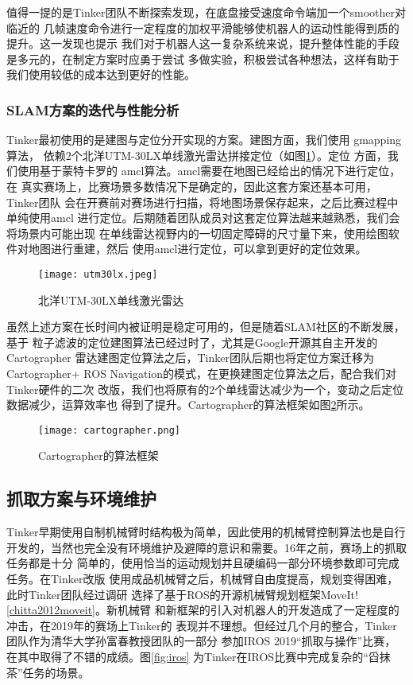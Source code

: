 值得一提的是Tinker团队不断探索发现，在底盘接受速度命令端加一个smoother对临近的
几帧速度命令进行一定程度的加权平滑能够使机器人的运动性能得到质的提升。这一发现也提示
我们对于机器人这一复杂系统来说，提升整体性能的手段是多元的，在制定方案时应勇于尝试
多做实验，积极尝试各种想法，这样有助于我们使用较低的成本达到更好的性能。

\subsubsection{SLAM方案的迭代与性能分析}

Tinker最初使用的是建图与定位分开实现的方案。建图方面，我们使用 gmapping算法\cite{grisettiyz2005improving}，
依赖2个北洋UTM-30LX单线激光雷达拼接定位（如图\ref{fig:utm30lx}）。定位
方面，我们使用基于蒙特卡罗的
amcl算法\cite{fox2002kld}。amcl需要在地图已经给出的情况下进行定位，在
真实赛场上，比赛场景多数情况下是确定的，因此这套方案还基本可用，Tinker团队
会在开赛前对赛场进行扫描，将地图场景保存起来，之后比赛过程中单纯使用amcl
进行定位。后期随着团队成员对这套定位算法越来越熟悉，我们会将场景内可能出现
在单线雷达视野内的一切固定障碍的尺寸量下来，使用绘图软件对地图进行重建，然后
使用amcl进行定位，可以拿到更好的定位效果。

\begin{figure}
  \centering
  \texttt{[image: utm30lx.jpeg]}
  \caption{北洋UTM-30LX单线激光雷达}
  \label{fig:utm30lx}
\end{figure}


虽然上述方案在长时间内被证明是稳定可用的，但是随着SLAM社区的不断发展，基于
粒子滤波的定位建图算法已经过时了，尤其是Google开源其自主开发的Cartographer
雷达建图定位算法\cite{hess2016real}之后，Tinker团队后期也将定位方案迁移为Cartographer+
ROS Navigation的模式，在更换建图定位算法之后，配合我们对Tinker硬件的二次
改版，我们也将原有的2个单线雷达减少为一个，变动之后定位数据减少，运算效率也
得到了提升。Cartographer的算法框架如图\ref{fig:cartographer}所示。

\begin{figure}[h] %
  \centering
  \texttt{[image: cartographer.png]}
  \caption{Cartographer的算法框架}
  \label{fig:cartographer}
\end{figure}

\subsection{抓取方案与环境维护}

Tinker早期使用自制机械臂时结构极为简单，因此使用的机械臂控制算法也是自行
开发的，当然也完全没有环境维护及避障的意识和需要。16年之前，赛场上的抓取任务都是十分
简单的，使用恰当的运动规划并且硬编码一部分环境参数即可完成任务。在Tinker改版
使用成品机械臂之后，机械臂自由度提高，规划变得困难，此时Tinker团队经过调研
选择了基于ROS的开源机械臂规划框架MoveIt!\ref{chitta2012moveit}。新机械臂
和新框架的引入对机器人的开发造成了一定程度的冲击，在2019年的赛场上Tinker的
表现并不理想。但经过几个月的整合，Tinker团队作为清华大学孙富春教授团队的一部分
参加IROS 2019“抓取与操作”比赛，在其中取得了不错的成绩。图\ref{fig:iros}
为Tinker在IROS比赛中完成复杂的“舀抹茶”任务的场景。

